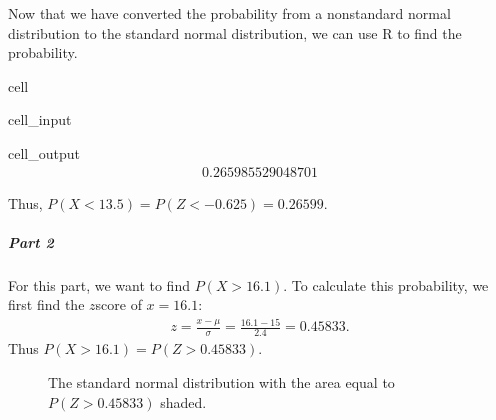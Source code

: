 \documentclass[letterpaper,10pt,english]{jupyterBook}
\begin{document}
\sphinxAtStartPar
Now that we have converted the probability from a non\sphinxhyphen{}standard normal distribution to the standard normal distribution, we can use R to find the probability.

\begin{sphinxuseclass}{cell}\begin{sphinxVerbatimInput}

\begin{sphinxuseclass}{cell_input}
\begin{sphinxVerbatim}[commandchars=\\\{\}]
\end{sphinxVerbatim}

\end{sphinxuseclass}\end{sphinxVerbatimInput}
\begin{sphinxVerbatimOutput}

\begin{sphinxuseclass}{cell_output}\begin{equation*}
\begin{split}0.265985529048701\end{split}
\end{equation*}
\end{sphinxuseclass}\end{sphinxVerbatimOutput}

\end{sphinxuseclass}
\sphinxAtStartPar
Thus, \(P(X < 13.5) = P(Z < -0.625) = 0.26599\).


\subparagraph{Part 2}
\label{\detokenize{Ch4 The Normal Distribution and the Central Limit Theorem/4.3 The Normal Distribution and z-scores:part-2}}
\sphinxAtStartPar
For this part, we want to find \(P(X > 16.1)\). To calculate this probability, we first find the \(z\)\sphinxhyphen{}score of \(x = 16.1\):
\begin{equation*}
\begin{split} z = \frac{x - \mu}{\sigma} = \frac{16.1 - 15}{2.4} = 0.45833. \end{split}
\end{equation*}
\sphinxAtStartPar
Thus \(P(X > 16.1) = P(Z > 0.45833)\).

\begin{figure}[htbp]
\centering
\capstart

\noindent{}
\caption{The standard normal distribution with the area equal to \(P(Z > 0.45833)\) shaded.}\label{\detokenize{Ch4 The Normal Distribution and the Central Limit Theorem/4.3 The Normal Distribution and z-scores:stdnormal-ex12}}\end{figure}
\end{document}
